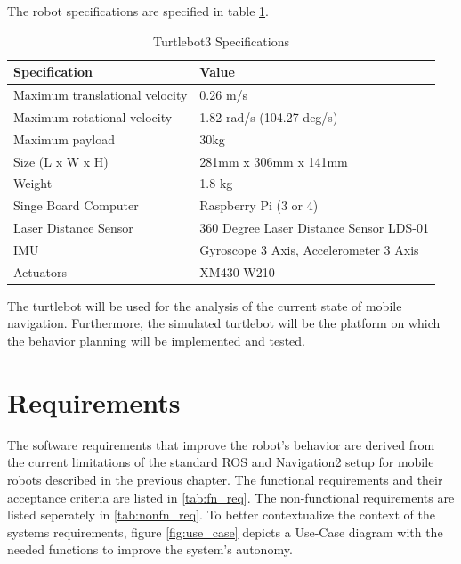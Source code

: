 The robot specifications are specified in table \ref{tab:turtlebot_spec}. 

\begin{table}[ht]
\caption{Turtlebot3 Specifications}
\label{tab:turtlebot_spec}
	\begin{tabular}{| m{} | m{} |} 
  	\hline
  	\textbf{Specification} & \textbf{Value} \\ 
  	\hline
  	Maximum translational velocity & 0.26 m/s \\ 
  	\hline
  	Maximum rotational velocity & 1.82 rad/s (104.27 deg/s) \\
  	\hline
  	Maximum payload & 30kg \\
  	\hline
  	Size (L x W x H) & 281mm x 306mm x 141mm \\
  	\hline
  	Weight & 1.8 kg \\
  	\hline
  	Singe Board Computer & Raspberry Pi (3 or 4) \\
  	\hline
  	Laser Distance Sensor & 360 Degree Laser Distance Sensor LDS-01 \\
  	\hline
  	IMU & Gyroscope 3 Axis, Accelerometer 3 Axis \\
  	\hline
  	Actuators & XM430-W210 \\
  	\hline
	\end{tabular}
\end{table}

The turtlebot will be used for the analysis of the current state of mobile navigation. Furthermore, the simulated turtlebot will be the platform on which the behavior planning will be implemented and tested.


\section{Requirements}

The software requirements that improve the robot's behavior are derived from the current limitations of the standard ROS and Navigation2 setup for mobile robots described in the previous chapter. 
The functional requirements and their acceptance criteria are listed in \ref{tab:fn_req}. The non-functional requirements are listed seperately in \ref{tab:nonfn_req}. 
To better contextualize the context of the systems requirements, figure \ref{fig:use_case} depicts a Use-Case diagram with the needed functions to improve the system's autonomy.

